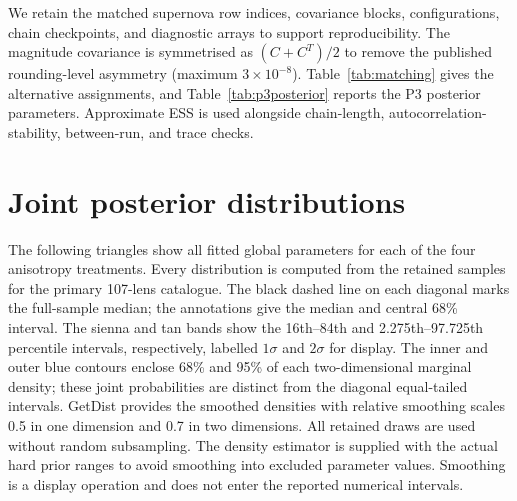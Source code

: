 \documentclass{aa}
\begin{document}
We retain the matched supernova row indices, covariance blocks, configurations, chain checkpoints, and diagnostic arrays to support reproducibility. The magnitude covariance is symmetrised as $(C+C^T)/2$ to remove the published rounding-level asymmetry (maximum $3\times10^{-8}$). Table~\ref{tab:matching} gives the alternative assignments, and Table~\ref{tab:p3posterior} reports the P3 posterior parameters. Approximate ESS is used alongside chain-length, autocorrelation-stability, between-run, and trace checks.
\begin{table}[t]\centering\small\caption{Accepted posterior diagnostics. Each row contains four independent ensembles or chains. The minimum approximate ESS and maximum rank-normalised split $\widehat R$ include every varying latent coordinate for the slope-error products.}\label{tab:diagnostics}\end{table}
\begin{table}[t]\centering\small\caption{Alternative matching assignments. Comparisons are within each row; shared triplets use original lens and SN identifiers.}\label{tab:matching}\end{table}
\begin{table}[t]\centering\small\caption{P3 power-law posterior medians and central 68\% intervals, at the sample median redshift and median structural predictor.}\label{tab:p3posterior}\end{table}

\section{Joint posterior distributions}\label{sec:joint_posteriors}
The following triangles show all fitted global parameters for each of the four anisotropy treatments. Every distribution is computed from the retained samples for the primary 107-lens catalogue. The black dashed line on each diagonal marks the full-sample median; the annotations give the median and central 68\% interval. The sienna and tan bands show the 16th--84th and 2.275th--97.725th percentile intervals, respectively, labelled $1\sigma$ and $2\sigma$ for display. The inner and outer blue contours enclose 68\% and 95\% of each two-dimensional marginal density; these joint probabilities are distinct from the diagonal equal-tailed intervals. GetDist provides the smoothed densities with relative smoothing scales 0.5 in one dimension and 0.7 in two dimensions. All retained draws are used without random subsampling. The density estimator is supplied with the actual hard prior ranges to avoid smoothing into excluded parameter values. Smoothing is a display operation and does not enter the reported numerical intervals.
\end{document}
